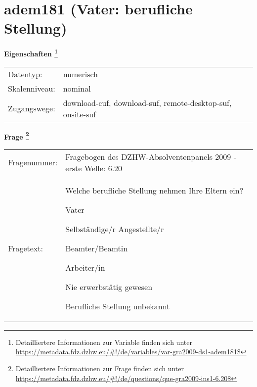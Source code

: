 
    \setcounter{footnote}{0}

    \vspace*{-1.8cm}
	\section{adem181 (Vater: berufliche Stellung)}
	\label{section:adem181}



    \vspace*{0.5cm}
    \noindent\textbf{Eigenschaften
	\footnote{Detailliertere Informationen zur Variable finden sich unter
		\url{https://metadata.fdz.dzhw.eu/\#!/de/variables/var-gra2009-ds1-adem181$}}}\\
	\begin{tabularx}{\hsize}{@{}lX}
	Datentyp: & numerisch \\
	Skalenniveau: & nominal \\
	Zugangswege: &
	  download-cuf, 
	  download-suf, 
	  remote-desktop-suf, 
	  onsite-suf
 \\
    \end{tabularx}



				\vspace*{0.5cm}
                \noindent\textbf{Frage
	                \footnote{Detailliertere Informationen zur Frage finden sich unter
		              \url{https://metadata.fdz.dzhw.eu/\#!/de/questions/que-gra2009-ins1-6.20$}}}\\
				\begin{tabularx}{\hsize}{@{}lX}
					Fragenummer: &
					  Fragebogen des DZHW-Absolventenpanels 2009 - erste Welle:
					  6.20
 \\
					Fragetext: & Welche berufliche Stellung nehmen Ihre Eltern ein?\par  Vater\par  Selbständige/r Angestellte/r\par  Beamter/Beamtin\par  Arbeiter/in\par  Nie erwerbstätig gewesen\par  Berufliche Stellung unbekannt \\
				\end{tabularx}





